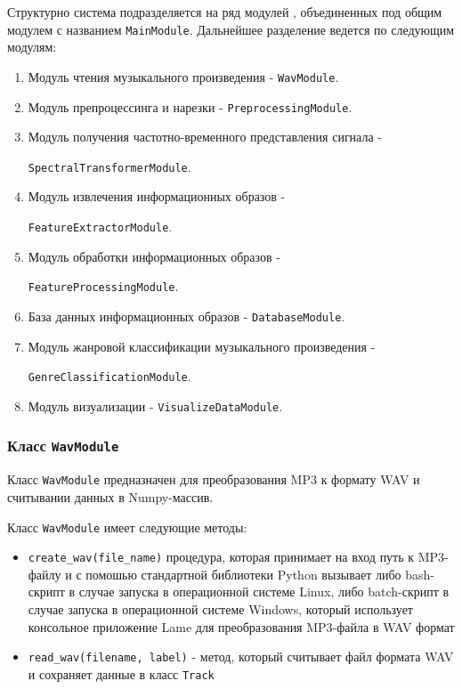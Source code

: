 Структурно система подразделяется на ряд модулей , объединенных под общим модулем с названием \texttt{MainModule}. Дальнейшее разделение ведется по следующим модулям:
\begin{enumerate}[label=\arabic*.]
\item{Модуль чтения музыкального произведения - \texttt{WavModule}.}
\item{Модуль препроцессинга и нарезки - \texttt{PreprocessingModule}.}
\item{Модуль получения частотно-временного представления сигнала -
 
\texttt{SpectralTransformerModule}.}
\item{Модуль извлечения информационных образов -

\texttt{FeatureExtractorModule}.}
\item{Модуль обработки информационных образов - 

\texttt{FeatureProcessingModule}. }
\item{База данных информационных образов - \texttt{DatabaseModule}.}
\item{Модуль жанровой классификации музыкального произведения -

\texttt{GenreClassificationModule}.}
\item{Модуль визуализации - \texttt{VisualizeDataModule}.}
\end{enumerate}

\subsubsection{Класс \texttt{WavModule}}

Класс \texttt{WavModule} предназначен для преобразования MP3 к формату WAV и считывании данных в Numpy-массив. 

Класс \texttt{WavModule} имеет следующие методы:

\begin{itemize}
\item{ \texttt{create\_wav(file\_name)}  процедура, которая принимает на вход путь к MP3-файлу и с помошью стандартной библиотеки Python вызывает либо bash-скрипт в случае запуска в операционной системе Linux, либо batch-скрипт в случае запуска в операционной системе Windows, который использует консольное приложение Lame для преобразования MP3-файла в WAV формат}
\item{ \texttt{read\_wav(filename, label)} - метод, который считывает файл формата WAV и сохраняет данные в класс \texttt{Track}}
\end{itemize}

